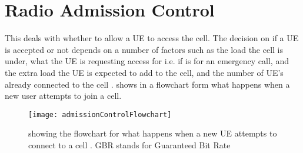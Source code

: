 \section{Radio Admission Control}
{
	This deals with whether to allow a UE to access the cell. The decision on if a UE is accepted or not depends on a number of factors such as the load the cell is under, what the UE is requesting access for i.e. if is for an emergency call, and the extra load the UE is expected to add to the cell, and the number of UE's already connected to the cell \cite{RadioAdmissionControl5594566}.  shows in a flowchart form what happens when a new user attempts to join a cell.
	\begin{figure}
		\centering
		\texttt{[image: admissionControlFlowchart]}
		\caption{showing the flowchart for what happens when a new UE attempts to connect to a cell \cite{RadioAdmissionControlPaolo}. GBR stands for Guaranteed Bit Rate}
		\label{fig:RACFlowchart}
	\end{figure}
}